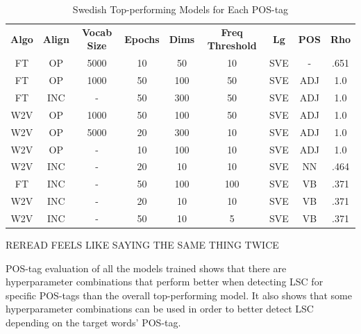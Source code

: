 \begin{table}[h]
\centering
\begin{tabular}{ccccccccc} 
\toprule
\textbf{ Algo } & \textbf{ Align } & \textbf{ Vocab Size } & \textbf{ Epochs } & \textbf{ Dims } & \textbf{ Freq Threshold } & \textbf{ Lg } & \textbf{ POS } & \textbf{ Rho }  \\
FT              & OP               & 5000                  & 10                & 50              & 10                        & SVE           & -              & .651            \\
FT              & OP               & 1000                  & 50                & 100             & 50                        & SVE           & ADJ            & 1.0             \\
FT              & INC              & -                     & 50                & 300             & 50                        & SVE           & ADJ            & 1.0             \\
W2V             & OP               & 1000                  & 50                & 100             & 50                        & SVE           & ADJ            & 1.0             \\
W2V             & OP               & 5000                  & 20                & 300             & 10                        & SVE           & ADJ            & 1.0             \\
W2V             & OP               & -                     & 10                & 100             & 10                        & SVE           & ADJ            & 1.0             \\
W2V             & INC              & -                     & 20                & 10              & 10                        & SVE           & NN             & .464            \\
FT              & INC              & -                     & 50                & 100             & 100                       & SVE           & VB             & .371            \\
W2V             & INC              & -                     & 20                & 10              & 10                        & SVE           & VB             & .371            \\
W2V             & INC              & -                     & 50                & 10              & 5                         & SVE           & VB             & .371            \\
\bottomrule
\end{tabular}
\caption{Swedish Top-performing Models for Each POS-tag}
\label{tab:sve-posresults}
\end{table}

REREAD FEELS LIKE SAYING THE SAME THING TWICE

POS-tag evaluation of all the models trained shows that there are hyperparameter combinations that perform better when detecting LSC for specific POS-tags than the overall top-performing model. It also shows that some hyperparameter combinations can be used in order to better detect LSC depending on the target words’ POS-tag. 
